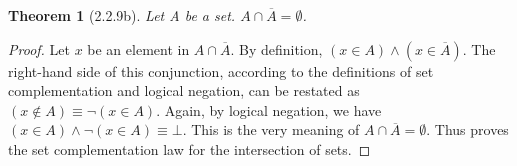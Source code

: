 \documentclass[a4paper, 12pt]{article}
\theoremstyle{plain}
\newtheorem*{theorem*}{Theorem}
\begin{document}
	
	\begin{theorem*}[2.2.9b]
		Let A be a set. $A \cap \overline{A} = \emptyset$.
	\end{theorem*}
	
	\begin{proof}
		Let $x$ be an element in $A \cap \overline{A}$. By definition, $(x \in A) \land (x \in \overline{A})$. The right-hand side of this conjunction, according to the definitions of set complementation and logical negation, can be restated as \newline $(x \notin A) \equiv \lnot (x \in A)$. Again, by logical negation, we have \newline $(x \in A) \land \lnot (x \in A) \equiv \bot$. This is the very meaning of $A \cap \overline{A} = \emptyset$. Thus proves the set complementation law for the intersection of sets.
	\end{proof}
\end{document}
